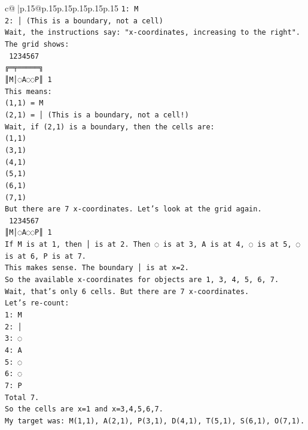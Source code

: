 \documentclass{article}
\begin{document}
{\begin{supertabular}{c@{$\;$}|p{.15\linewidth}@{}p{.15\linewidth}p{.15\linewidth}p{.15\linewidth}p{.15\linewidth}p{.15\linewidth}}
{{{\texttt{1: M} \\
\texttt{2: │ (This is a boundary, not a cell)} \\
\texttt{Wait, the instructions say: "x{-}coordinates, increasing to the right".} \\
\texttt{The grid shows:} \\
\texttt{ 1234567} \\
\texttt{╔═╤═════╗} \\
\texttt{║M│◌A◌◌P║ 1} \\
\texttt{This means:} \\
\texttt{(1,1) = M} \\
\texttt{(2,1) = │ (This is a boundary, not a cell!)} \\
\texttt{Wait, if (2,1) is a boundary, then the cells are:} \\
\texttt{(1,1)} \\
\texttt{(3,1)} \\
\texttt{(4,1)} \\
\texttt{(5,1)} \\
\texttt{(6,1)} \\
\texttt{(7,1)} \\
\texttt{But there are 7 x{-}coordinates. Let's look at the grid again.} \\
\texttt{ 1234567} \\
\texttt{║M│◌A◌◌P║ 1} \\
\texttt{If M is at 1, then │ is at 2. Then ◌ is at 3, A is at 4, ◌ is at 5, ◌ is at 6, P is at 7.} \\
\texttt{This makes sense. The boundary │ is at x=2.} \\
\texttt{So the available x{-}coordinates for objects are 1, 3, 4, 5, 6, 7.} \\
\texttt{Wait, that's only 6 cells. But there are 7 x{-}coordinates.} \\
\texttt{Let's re{-}count:} \\
\texttt{1: M} \\
\texttt{2: │} \\
\texttt{3: ◌} \\
\texttt{4: A} \\
\texttt{5: ◌} \\
\texttt{6: ◌} \\
\texttt{7: P} \\
\texttt{Total 7.} \\
\texttt{So the cells are x=1 and x=3,4,5,6,7.} \\
\texttt{My target was: M(1,1), A(2,1), P(3,1), D(4,1), T(5,1), S(6,1), O(7,1).} \\
}}}
\end{supertabular}}
\end{document}
